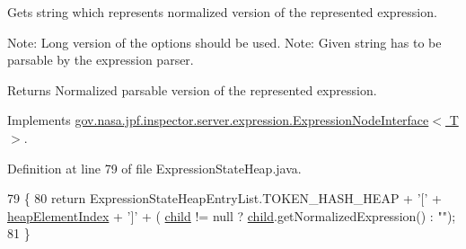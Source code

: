 Gets string which represents normalized version of the represented expression. 

Note\+: Long version of the options should be used. Note\+: Given string has to be parsable by the expression parser.

\begin{DoxyReturn}{Returns}
Normalized parsable version of the represented expression. 
\end{DoxyReturn}


Implements \hyperlink{interfacegov_1_1nasa_1_1jpf_1_1inspector_1_1server_1_1expression_1_1_expression_node_interface_ae5387d8da0126c1256a786d54b9bd7ce}{gov.\+nasa.\+jpf.\+inspector.\+server.\+expression.\+Expression\+Node\+Interface$<$ T $>$}.



Definition at line 79 of file Expression\+State\+Heap.\+java.


\begin{DoxyCode}
79                                            \{
80     \textcolor{keywordflow}{return} ExpressionStateHeapEntryList.TOKEN\_HASH\_HEAP + \textcolor{charliteral}{'['} + \hyperlink{classgov_1_1nasa_1_1jpf_1_1inspector_1_1server_1_1expression_1_1expressions_1_1_expression_state_heap_afffce10742fdcd015d276f6c397a9921}{heapElementIndex} + \textcolor{charliteral}{']'} + (
      \hyperlink{classgov_1_1nasa_1_1jpf_1_1inspector_1_1server_1_1expression_1_1_expression_state_unary_operator_a66041b1f569a361549e28a00f7ca5f2f}{child} != null ? \hyperlink{classgov_1_1nasa_1_1jpf_1_1inspector_1_1server_1_1expression_1_1_expression_state_unary_operator_a66041b1f569a361549e28a00f7ca5f2f}{child}.getNormalizedExpression() : \textcolor{stringliteral}{""});
81   \}
\end{DoxyCode}
